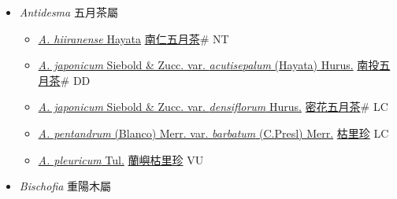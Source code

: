 
  \begin{itemize}
 \item[] \textit{Antidesma} 五月茶屬
                    
  \begin{itemize}
        \item[] \href{http://www.theplantlist.org/tpl1.1/search?q=Antidesma+hiiranense}{\textit{A. hiiranense} Hayata}   \href{\detokenize{http://taibnet.sinica.edu.tw/chi/taibnet_species_list.php?T2=南仁五月茶&T2_new_value=true&fr=y}}{南仁五月茶}\# NT
        \item[] \href{http://www.theplantlist.org/tpl1.1/search?q=Antidesma+japonicum+var.+acutisepalum}{\textit{A. japonicum} Siebold \& Zucc. var. \textit{acutisepalum} (Hayata) Hurus.}   \href{\detokenize{http://taibnet.sinica.edu.tw/chi/taibnet_species_list.php?T2=南投五月茶&T2_new_value=true&fr=y}}{南投五月茶}\# DD
        \item[] \href{http://www.theplantlist.org/tpl1.1/search?q=Antidesma+japonicum+var.+densiflorum}{\textit{A. japonicum} Siebold \& Zucc. var. \textit{densiflorum} Hurus.}   \href{\detokenize{http://taibnet.sinica.edu.tw/chi/taibnet_species_list.php?T2=密花五月茶&T2_new_value=true&fr=y}}{密花五月茶}\# LC
        \item[] \href{http://www.theplantlist.org/tpl1.1/search?q=Antidesma+pentandrum+var.+barbatum}{\textit{A. pentandrum} (Blanco) Merr. var. \textit{barbatum} (C.Presl) Merr.}   \href{\detokenize{http://taibnet.sinica.edu.tw/chi/taibnet_species_list.php?T2=枯里珍&T2_new_value=true&fr=y}}{枯里珍} LC
        \item[] \href{http://www.theplantlist.org/tpl1.1/search?q=Antidesma+pleuricum}{\textit{A. pleuricum} Tul.}   \href{\detokenize{http://taibnet.sinica.edu.tw/chi/taibnet_species_list.php?T2=蘭嶼枯里珍&T2_new_value=true&fr=y}}{蘭嶼枯里珍} VU
  \end{itemize}
 \item[] \textit{Bischofia} 重陽木屬
                    

\end{itemize}
